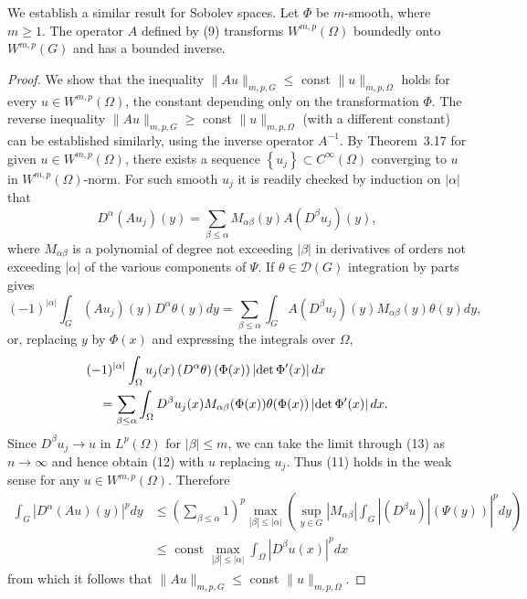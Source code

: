 \begin{theorem}
  We establish a similar result for Sobolev spaces.
  Let $\Phi$ be $m$-smooth, where $m \geq 1$. The operator $A$ defined by (9)
  transforms $W^{m,p}(\Omega)$ boundedly onto $W^{m,p}(G)$ and has a bounded inverse.
\end{theorem}

\begin{proof}
  We show that the inequality $\|A u\|_{m, p, G} \leq$ const $\|u\|_{m, p, \Omega}$ holds for 
  every $u \in W^{m, p}(\Omega)$, the constant depending only on the transformation $\Phi$.
  The reverse inequality $\|A u\|_{m, p, G} \geq$ const $\|u\|_{m, p, \Omega}$ (with a different 
  constant) can be established similarly, using the inverse operator $A^{-1}$.
  By Theorem~3.17 for given $u \in W^{m, p}(\Omega)$, there exists
  a sequence $\left\{u_j\right\} \subset C^{\infty}(\Omega)$ converging to $u$
  in $W^{m,p}(\Omega)$-norm.
  For such smooth $u_j$ it is readily checked by induction on $|\alpha|$ that
  \begin{equation}\label{eq:3.11}
    D^\alpha\left(A u_j\right)(y)=\sum_{\beta \leq \alpha} M_{\alpha \beta}(y) A\left(D^\beta u_j\right)(y),
  \end{equation}
  where $M_{\alpha \beta}$ is a polynomial of degree not exceeding $|\beta|$ in derivatives of 
  orders not exceeding $|\alpha|$ of the various components of $\Psi$.
  If $\theta \in \mathscr{D}(G)$ integration by parts gives
  \begin{equation}\label{eq:3.12}
    (-1)^{|\alpha|} \int_G\left(A u_j\right)(y) D^\alpha \theta(y) d y=\sum_{\beta \leq \alpha} \int_G A\left(D^\beta u_j\right)(y) M_{\alpha \beta}(y) \theta(y) d y,
  \end{equation}
  or, replacing $y$ by $\Phi(x)$ and expressing the integrals over $\Omega$,
  \begin{align}
  & (-1)^{|\alpha|} \int_{\Omega} u_j(x)\left(D^\alpha \theta\right)(\Phi(x))\left|\det \Phi^{\prime}(x)\right| d x \notag \\
  & \quad=\sum_{\beta \leq \alpha} \int_{\Omega} D^\beta u_j(x) M_{\alpha \beta}(\Phi(x)) \theta(\Phi(x))\left|\det \Phi^{\prime}(x)\right| d x . \label{eq:3.13}
  \end{align}
  Since $D^\beta u_j \rightarrow u$ in $L^p(\Omega)$ for $|\beta| \leq m$,
  we can take the limit through (13) as $n \rightarrow \infty$ and hence obtain (12) with $u$ 
  replacing $u_j$. Thus (11) holds in the weak sense for any $u \in W^{m, p}(\Omega)$. Therefore
  \[
  \begin{aligned}
  \int_G\left|D^\alpha(A u)(y)\right|^p d y & \leq\left(\sum_{\beta \leq \alpha} 1\right)^p \max _{|\beta| \leq|\alpha|}\left(\left.\sup _{y \in G}\left|M_{\alpha \beta}\right| \int_G\left|\left(D^\beta u\right)\right|(\Psi(y))\right|^p d y\right) \\
  & \leq \text { const } \max _{|\beta| \leq|\alpha|} \int_{\Omega}\left|D^\beta u(x)\right|^p d x
  \end{aligned}
  \]
  from which it follows that $\|A u\|_{m, p, G} \leq$ const $\|u\|_{m, p, \Omega}$.
\end{proof}

